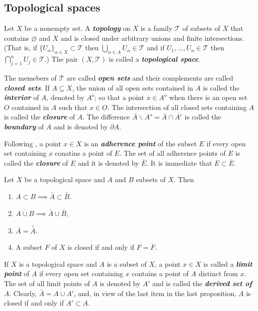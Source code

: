 \documentclass{article}
\theoremstyle{definition}
\numberwithin{equation}{section}
\begin{document}
	\subsection{Topological spaces}
	Let $X$ be a nonempty set. A \textbf{\textit{topology}} on $X$ is a family $\mathcal{T}$ of subsets of $X$ that contains $\varnothing$ and $X$ and is closed under arbitrary unions and finite intersections. (That is, if $\{U_\alpha\}_{\alpha\in X}\subset\mathcal{T}$ then $\bigcup_{\alpha\in A}U_\alpha\in\mathcal{T}$ and if $U_1,\ldots, U_n\in\mathcal{T}$ then $\bigcap_{j=1}^nU_j\in\mathcal{T}$.) The pair $(X,\mathcal{T})$ is called a \textbf{\textit{topological space}}.
	
	The memebers of $\mathcal{T}$ are called \textbf{\textit{open sets}} and their complements are called \textbf{\textit{closed sets}}. If $A\subseteq X$, the union of all open sets contained in $A$ is called the \textbf{\textit{interior}} of $A$, denoted by $A^o$; so that a point $x\in A^o$ when there is an open set $O$ contained in $A$ such that $x\in O$. The intersection of all closed sets containing $A$ is called the \textbf{\textit{closure}} of $A$. The difference $\bar{A}\backslash A^o=\bar{A}\cap\overline{A^c}$ is called the \textbf{\textit{boundary}} of $A$ and is denoted by $\partial A$.
	
	Following \cite{narici}, a point $x\in X$ is an \textbf{\textit{adherence point}} of the subset $E$ if every open set containing $x$ conatins a point of $E$. The set of all adherence points of $E$ is called the \textbf{\textit{closure}} of $E$ and it is denoted by $\overline{E}$. It is immediate that $E\subset\overline{E}$.
	\begin{prop}
		Let $X$ be a topological space and $A$ and $B$ subsets of $X$. Then
		\begin{enumerate}
			\item $A\subset B\implies\bar{A}\subset\bar{B}$.
			\item $\overline{A\cup B}\implies\bar{A}\cup\bar{B}$,
			\item $\bar{A}=\bar{\bar{A}}$.
			\item A subset $F$ of $X$ is closed if and only if $F=\overline{F}$.
		\end{enumerate}
	\end{prop}
	If $X$ is a topological space and $A$ is a subset of $X$, a point $x\in X$ is called a \textbf{\textit{limit point}} of $A$ if every open set containing $x$ contains a point of $A$ distinct from $x$. The set of all limit points of $A$ is denoted by $A'$ and is called the \textbf{\textit{derived set of $A$}}. Clearly, $\bar{A}=A\cup A'$, and, in view of the last item in the last proposition, $A$ is closed if and only if $A'\subset A$.
	
\end{document}
